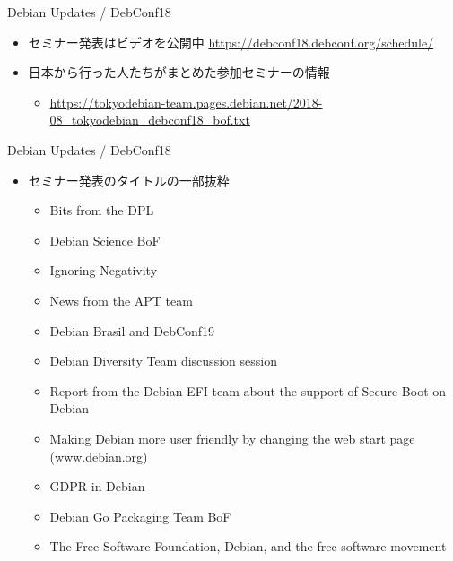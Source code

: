\documentclass[cjk,dvipdfmx,10pt,compress,%
hyperref={bookmarks=true,bookmarksnumbered=true,bookmarksopen=false,%
colorlinks=false,%
pdftitle={第 132 回 関西 Debian 勉強会},%
pdfauthor={かわだ},%
pdfsubject={資料},%
}]{beamer}
\begin{document}
\begin{frame}{Debian Updates / DebConf18}%
\begin{itemize}
\item セミナー発表はビデオを公開中 \url{https://debconf18.debconf.org/schedule/}
\item 日本から行った人たちがまとめた参加セミナーの情報
  \begin{itemize}
    \item \url{https://tokyodebian-team.pages.debian.net/2018-08_tokyodebian_debconf18_bof.txt}
  \end{itemize}
\end{itemize}
\end{frame}

\begin{frame}{Debian Updates / DebConf18}%
\begin{itemize}
\item セミナー発表のタイトルの一部抜粋
  \begin{itemize}
  \item Bits from the DPL
  \item Debian Science BoF
  \item Ignoring Negativity
  \item News from the APT team
  \item Debian Brasil and DebConf19
  \item Debian Diversity Team discussion session
  \item Report from the Debian EFI team about the support of Secure Boot on Debian
  \item Making Debian more user friendly by changing the web start page (www.debian.org)
  \item GDPR in Debian
  \item Debian Go Packaging Team BoF
  \item The Free Software Foundation, Debian, and the free software movement
  \end{itemize}
\end{itemize}
\end{frame}
\end{document}
